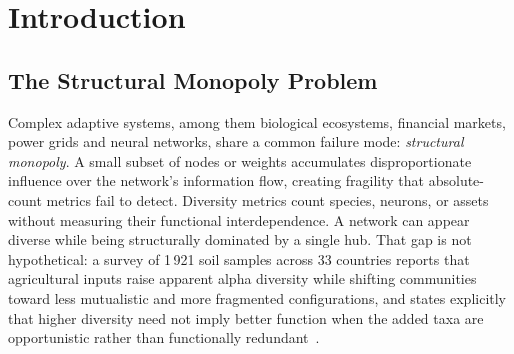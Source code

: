 \documentclass[11pt,a4paper]{article}
\begin{document}
\begin{abstract}
The framework has an immediate computational application: the Omega-S
regularizer~\cite{acedo2026omegas}, which minimises
$\operatorname{Tr}(WW^\top)^3$ during neural network training via
Hutchinson stochastic trace estimation. In the applied work that penalty is
combined with group lasso for structured pruning, where the compression
obtained is attributable to the group-lasso term and the marginal contribution
of the topological penalty remains to be isolated, and it improves
sequential-learning retention on Llama-3-8B, where the log-ratio Omega-S
regulariser leaves more code capability after a sequential fine-tune than no
regularisation at all on 9 of 10 seeds (absolute HumanEval $0.173 \to 0.238$,
$+37.7\%$ relative, one-sided sign test $p = 0.011$), and beats tuned weight
decay on 10 of 10 seeds ($p = 0.002$) and tuned EWC on 8 of 10 ($p = 0.014$)
on the same absolute measure, without access to previous-task data.


Throughout, ``resilience'' names a structural configuration and not a
measured return time: no result below measures recovery from a perturbation,
and Remark~\ref{rem:nomenclature} states the scope of the term.

\textbf{Keywords:} topological entropy, non-equilibrium thermodynamics,
clustering coefficient, Prigogine minimum entropy production, scale-free
networks, structural monopolies, neural network regularisation.
\end{abstract}

\tableofcontents
\vspace{1em}

\section{Introduction}

\subsection{The Structural Monopoly Problem}

Complex adaptive systems, among them biological ecosystems, financial
markets, power grids and neural networks, share a common failure mode:
\emph{structural monopoly}. A small subset of nodes or weights
accumulates disproportionate influence over the network's information
flow, creating fragility that absolute-count metrics fail to detect.
Diversity metrics count species, neurons, or assets without measuring
their functional interdependence. A network can appear diverse while
being structurally dominated by a single hub. That gap is not hypothetical:
a survey of 1\,921 soil samples across 33 countries reports that agricultural
inputs raise apparent alpha diversity while shifting communities toward less
mutualistic and more fragmented configurations, and states explicitly that
higher diversity need not imply better function when the added taxa are
opportunistic rather than functionally redundant~\cite{saati2026}.
\end{document}
